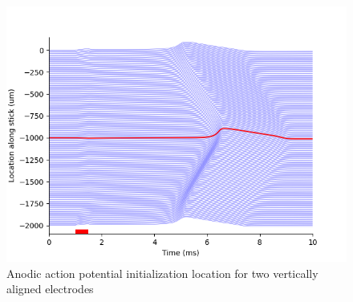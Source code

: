 \documentclass{article}
\begin{document}
\begin{figure}[htbp]
\begin{minipage}[b]{0.3\textwidth}
        \end{minipage}
        \hfill
        \begin{minipage}[b]{0.3\textwidth}
            \includegraphics[width=\textwidth]{FE_vertical_anodic_loc}
            \caption{Anodic action potential initialization location for two vertically aligned electrodes}
            \label{fig:FE_vertical_anodic_loc}
        \end{minipage}
    \end{figure}
\end{document}
